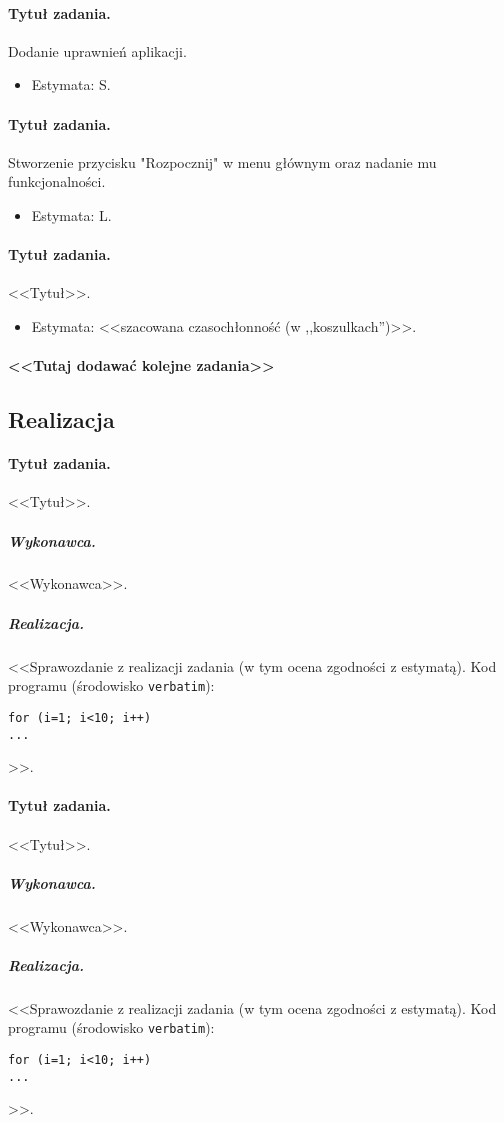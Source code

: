\documentclass[a4paper]{article}
\begin{document}
\paragraph{Tytuł zadania.} Dodanie uprawnień aplikacji.
\begin{itemize}
\item Estymata: S.
\end{itemize}

\paragraph{Tytuł zadania.} Stworzenie przycisku "Rozpocznij" w menu głównym oraz nadanie mu funkcjonalności.
\begin{itemize}
\item Estymata: L.
\end{itemize}

\paragraph{Tytuł zadania.} <<Tytuł>>.
\begin{itemize}
\item Estymata: <<szacowana czasochłonność (w ,,koszulkach'')>>.
\end{itemize}

\paragraph{<<Tutaj dodawać kolejne zadania>>}

\subsection{Realizacja} %

\paragraph{Tytuł zadania.} <<Tytuł>>.
\subparagraph{Wykonawca.} <<Wykonawca>>.
\subparagraph{Realizacja.} <<Sprawozdanie z realizacji zadania (w tym ocena zgodności z estymatą). Kod programu (środowisko \texttt{verbatim}): \begin{verbatim}
for (i=1; i<10; i++)
...
\end{verbatim}>>.

\paragraph{Tytuł zadania.} <<Tytuł>>.
\subparagraph{Wykonawca.} <<Wykonawca>>.
\subparagraph{Realizacja.} <<Sprawozdanie z realizacji zadania (w tym ocena zgodności z estymatą). Kod programu (środowisko \texttt{verbatim}): \begin{verbatim}
for (i=1; i<10; i++)
...
\end{verbatim}>>.
\end{document}
